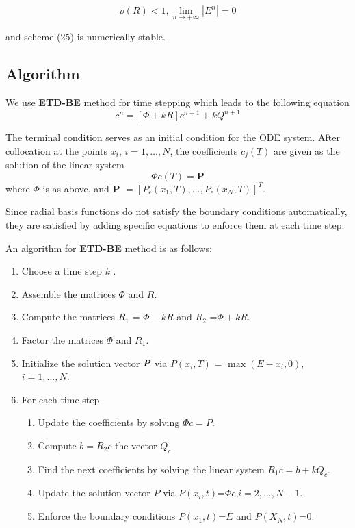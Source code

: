 \documentclass[12pt]{article}
\numberwithin{equation}{section} %
\begin{document}
\begin{equation*}
\rho(R)<1, \lim_{n \rightarrow +\infty} |E^n|= 0
\end{equation*}

and scheme (25) is numerically stable.


\subsection{Algorithm}
 We use   \textbf{ETD-BE} method for time stepping which leads to the following equation\\
\vspace{5mm}
\begin{equation}
[\Phi-kR]c^n=[\Phi +kR]c^{n+1}+kQ^{n+1}
\end{equation}

The terminal condition serves as an initial condition for the ODE
system. After collocation at the points $x_i$, $i=1,\ldots,N$, the
coefficients $c_j(T)$ are given as the solution of the linear system
\begin{equation*}
\Phi c(T)=\textbf{P}
\end{equation*}
where $\Phi$ is as above, and
  $ \textbf{P }= [P_\epsilon(x_1,T),\ldots,P_\epsilon(x_N,T)]^T$.

Since  radial basis functions do not satisfy the boundary conditions
automatically, they are satisfied by adding specific equations to
enforce them at each time step.

An algorithm for  \textbf{ETD-BE} method is as follows:

\begin{enumerate}
\item Choose a time step $k$ .
\item Assemble the matrices $\Phi$ and $R$.
\item Compute the matrices $R_1$ = $\Phi-k R$ and $R_2$ =$ \Phi+kR$.
\item Factor the matrices $\Phi$ and $R_1$.
\item Initialize the solution vector  $\textit{\textbf{P}}$ via $P(x_i,T)$ = $\max (E-x_i,0)$, $i=1,...,N$.
\item For each time step
\begin{enumerate}
\item Update the coefficients by solving $\Phi c=P$.
\item Compute $ b=R_{2}c$ the vector $Q_c$
\item Find the next coefficients by solving the linear system $R_{1}c=b+kQ_{c}$.
\item Update the solution vector $P$ via $P(x_i,t)$=$\Phi c$,$i=2,...,N-1$.
\item Enforce the boundary conditions $P(x_1,t)$=$E$ and $P(X_N,t)$=$0$.
\end{enumerate}
\end{enumerate}
\end{document}
